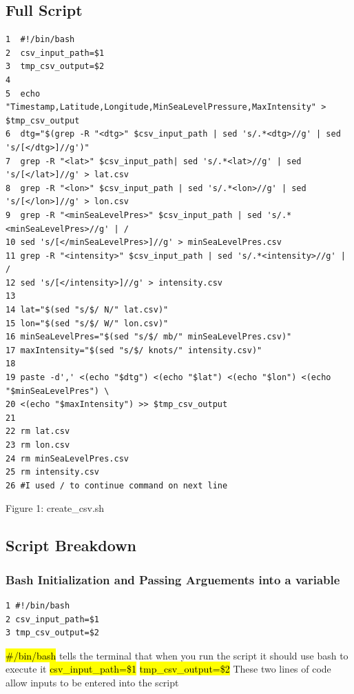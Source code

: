 \documentclass[]{article}
\begin{document}
\subsection{Full Script}
\begin{tcolorbox}[colback=white, colframe=black, boxrule=1pt, 
    title=create\_csv.sh, width=6.7in, fonttitle=\bfseries, listing only, listing options={language=sh, basicstyle=\ttfamily}]
\begin{verbatim}
1  #!/bin/bash
2  csv_input_path=$1
3  tmp_csv_output=$2
4
5  echo "Timestamp,Latitude,Longitude,MinSeaLevelPressure,MaxIntensity" > $tmp_csv_output
6  dtg="$(grep -R "<dtg>" $csv_input_path | sed 's/.*<dtg>//g' | sed 's/[</dtg>]//g')"
7  grep -R "<lat>" $csv_input_path| sed 's/.*<lat>//g' | sed 's/[</lat>]//g' > lat.csv
8  grep -R "<lon>" $csv_input_path | sed 's/.*<lon>//g' | sed 's/[</lon>]//g' > lon.csv
9  grep -R "<minSeaLevelPres>" $csv_input_path | sed 's/.*<minSeaLevelPres>//g' | /
10 sed 's/[</minSeaLevelPres>]//g' > minSeaLevelPres.csv
11 grep -R "<intensity>" $csv_input_path | sed 's/.*<intensity>//g' | / 
12 sed 's/[</intensity>]//g' > intensity.csv
13 
14 lat="$(sed "s/$/ N/" lat.csv)"
15 lon="$(sed "s/$/ W/" lon.csv)"
16 minSeaLevelPres="$(sed "s/$/ mb/" minSeaLevelPres.csv)"
17 maxIntensity="$(sed "s/$/ knots/" intensity.csv)"
18
19 paste -d',' <(echo "$dtg") <(echo "$lat") <(echo "$lon") <(echo "$minSeaLevelPres") \
20 <(echo "$maxIntensity") >> $tmp_csv_output
21
22 rm lat.csv
23 rm lon.csv
24 rm minSeaLevelPres.csv
25 rm intensity.csv
26 #I used / to continue command on next line
\end{verbatim}
\end{tcolorbox}
\begin{center}
    Figure 1: create\_csv.sh
\end{center}

\subsection{Script Breakdown}
\subsubsection{Bash Initialization and Passing Arguements into a variable}
\begin{tcolorbox}[colback=white, colframe=black, boxrule=1pt, 
    title=Bash Initialization and Passing Arguements into a variable, width=6.7in, fonttitle=\bfseries, listing only, listing options={language=sh, basicstyle=\ttfamily}]
    \begin{verbatim}
1 #!/bin/bash
2 csv_input_path=$1
3 tmp_csv_output=$2
    \end{verbatim}
\hl{\#\!/bin/bash}\newline
tells the terminal that when you run the script it should use bash to execute it\newline
\hl{csv\_input\_path=\$1}\newline
\hl{tmp\_csv\_output=\$2}\newline
These two lines of code allow inputs to be entered into the script
\end{tcolorbox}
\end{document}
